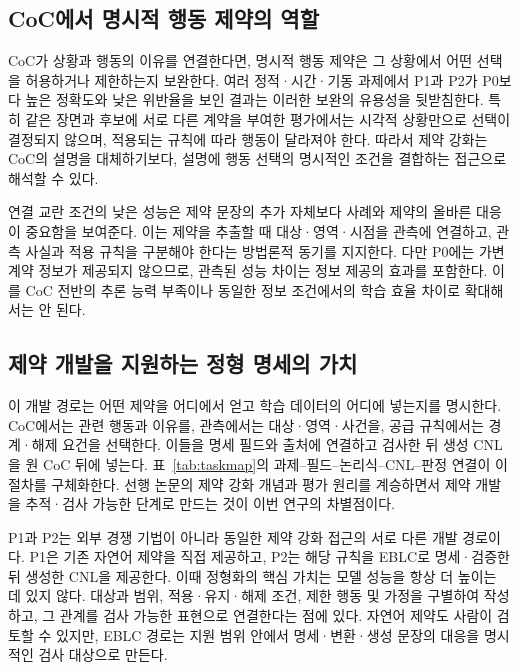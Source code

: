 \documentclass[10pt,a4paper,twocolumn]{article}\usepackage[margin=18mm]{geometry}\usepackage{fontspec,kotex}
\begin{document}
\subsection{CoC에서 명시적 행동 제약의 역할}

CoC가 상황과 행동의 이유를 연결한다면, 명시적 행동 제약은 그 상황에서 어떤 선택을 허용하거나 제한하는지 보완한다. 여러 정적·시간·기동 과제에서 P1과 P2가 P0보다 높은 정확도와 낮은 위반율을 보인 결과는 이러한 보완의 유용성을 뒷받침한다. 특히 같은 장면과 후보에 서로 다른 계약을 부여한 평가에서는 시각적 상황만으로 선택이 결정되지 않으며, 적용되는 규칙에 따라 행동이 달라져야 한다. 따라서 제약 강화는 CoC의 설명을 대체하기보다, 설명에 행동 선택의 명시적인 조건을 결합하는 접근으로 해석할 수 있다.\par

연결 교란 조건의 낮은 성능은 제약 문장의 추가 자체보다 사례와 제약의 올바른 대응이 중요함을 보여준다. 이는 제약을 추출할 때 대상·영역·시점을 관측에 연결하고, 관측 사실과 적용 규칙을 구분해야 한다는 방법론적 동기를 지지한다. 다만 P0에는 가변 계약 정보가 제공되지 않으므로, 관측된 성능 차이는 정보 제공의 효과를 포함한다. 이를 CoC 전반의 추론 능력 부족이나 동일한 정보 조건에서의 학습 효율 차이로 확대해서는 안 된다.\par

\subsection{제약 개발을 지원하는 정형 명세의 가치}

이 개발 경로는 어떤 제약을 어디에서 얻고 학습 데이터의 어디에 넣는지를 명시한다. CoC에서는 관련 행동과 이유를, 관측에서는 대상·영역·사건을, 공급 규칙에서는 경계·해제 요건을 선택한다. 이들을 명세 필드와 출처에 연결하고 검사한 뒤 생성 CNL을 원 CoC 뒤에 넣는다. 표~\ref{tab:taskmap}의 과제--필드--논리식--CNL--판정 연결이 이 절차를 구체화한다. 선행 논문의 제약 강화 개념과 평가 원리를 계승하면서 제약 개발을 추적·검사 가능한 단계로 만드는 것이 이번 연구의 차별점이다.\par

P1과 P2는 외부 경쟁 기법이 아니라 동일한 제약 강화 접근의 서로 다른 개발 경로이다. P1은 기존 자연어 제약을 직접 제공하고, P2는 해당 규칙을 EBLC로 명세·검증한 뒤 생성한 CNL을 제공한다. 이때 정형화의 핵심 가치는 모델 성능을 항상 더 높이는 데 있지 않다. 대상과 범위, 적용·유지·해제 조건, 제한 행동 및 가정을 구별하여 작성하고, 그 관계를 검사 가능한 표현으로 연결한다는 점에 있다. 자연어 제약도 사람이 검토할 수 있지만, EBLC 경로는 지원 범위 안에서 명세·변환·생성 문장의 대응을 명시적인 검사 대상으로 만든다.\par
\end{document}
